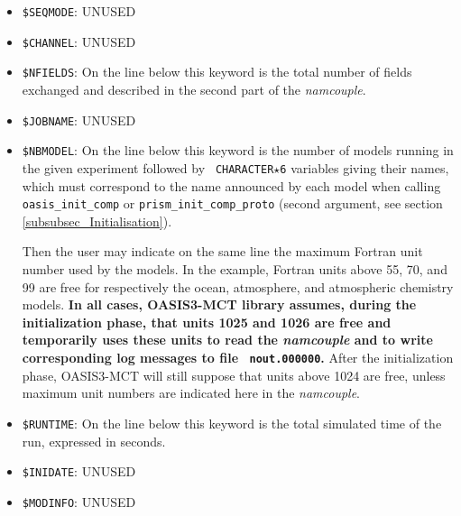 \begin{itemize}

\item {\tt \$SEQMODE}: UNUSED 

\item {\tt \$CHANNEL}: UNUSED

\item {\tt \$NFIELDS}: On the line below this keyword is the total
number of fields exchanged and described in the second part of
the {\it namcouple}. 

\item {\tt \$JOBNAME}: UNUSED

\item {\tt \$NBMODEL}: On the line below this keyword is the number of
models running in the given experiment followed by {\tt
CHARACTER$\star$6} variables giving their names, which must correspond
to the name announced by each model when calling {\tt
  oasis\_init\_comp} or {\tt prism\_init\_comp\_proto} (second argument, see section \ref{subsubsec_Initialisation}). 

Then the user may
indicate on the same line the maximum Fortran unit number used by the models. In  the
example, Fortran units above 55, 70, and 99 are free for respectively
the ocean, atmosphere, and atmospheric chemistry models. {\bf In all cases,
OASIS3-MCT library assumes, during the initialization phase, that units 1025 and 1026 are free and
temporarily uses these units to read the {\it
  namcouple} and to write corresponding log messages to file {\tt
  nout.000000}.} After the initialization phase, OASIS3-MCT will
still suppose that units above 1024 are free, unless
maximum unit numbers are indicated here in the {\it namcouple}.

\item {\tt \$RUNTIME}: On the line below this keyword is the total
simulated time of the run, expressed in seconds. 

\item {\tt \$INIDATE}: UNUSED

\item {\tt \$MODINFO}: UNUSED
 

\end{itemize}
